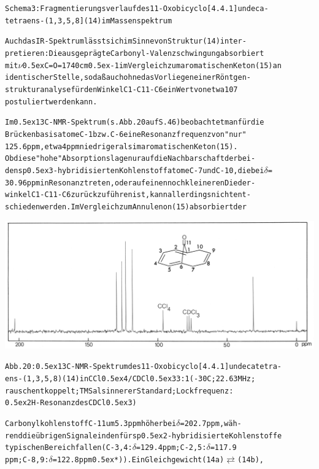 \documentclass[a4paper,11pt]{article}
\begin{document}
\begin{alltt}
Schema 3: Fragmentierungsverlauf des 11-Oxobicyclo[4.4.1]undeca-
tetraens-(1,3,5,8] (14) im Massenspektrum
 

Auch das IR-Spektrum lässt sich im Sinne von Struktur (14) inter-
pretieren: Die ausgeprägte Carbonyl-Valenzschwingung absorbiert
mit \(\nu\)\lower0.5ex\hbox{C=O} = 1740 cm\raise0.5ex\hbox{-1} im Vergleich zum aromatischen Keton (15) an
identischer Stelle, so daß auch ohne das Vorliegen einer Röntgen-
strukturanalyse für den Winkel C1-C11-C6 ein Wert von etwa 107\degree
postuliert werden kann.

Im \raise0.5ex\hbox{13}C-NMR-Spektrum (s. Abb. 20 auf S. 46) beobachtet man für die
Brückenbasisatome C-1 bzw. C-6 eine Resonanzfrequenz von "nur"
125.6 ppm, etwa 4 ppm niedriger als im aromatischen Keton (15).
Ob diese "hohe" Absorptionslage nur auf die Nachbarschaft der bei-
den sp\raise0.5ex\hbox{3}-hybridisierten Kohlenstoffatome C-7 und C-10, die bei \(\delta\) =
30.96 ppm in Resonanz treten, oder auf einen noch kleineren Dieder-
winkel C1-C11-C6 zurückzuführen ist, kann allerdings nicht ent-
schieden werden. Im Vergleich zum Annulenon (15) absorbiert der

\newpage
{}


\end{alltt}
\hspace*{-0.25cm}\includegraphics[width=14.63cm]{NMR_020}
\begin{alltt}
Abb. 20: \raise0.5ex\hbox{13}C-NMR-Spektrum des 11-Oxobicyclo[4.4.1]undecatetra-
ens-(1,3,5,8) (14) in CCl\lower0.5ex\hbox{4}/CDCl\lower0.5ex\hbox{3} 3:1 (-30\degree{}C; 22.63 MHz;
rauschentkoppelt; TMS als innerer Standard; Lockfrequenz:
\leavevmode\raise0.5ex\hbox{2}H-Resonanz des CDCl\lower0.5ex\hbox{3})

Carbonylkohlenstoff C-11 um 5.3 ppm höher bei \(\delta\) = 202.7 ppm, wäh-
rend die übrigen Signale in den für sp\raise0.5ex\hbox{2}-hybridisierte Kohlenstoffe
typischen Bereich fallen (C-3,4: \(\delta\) = 129.4 ppm; C-2,5: \(\delta\) = 117.9
ppm; C-8,9:\(\delta\) = 122.8 ppm \leavevmode\raise0.5ex\hbox{*})). Ein Gleichgewicht (14a) \(\rightleftarrows\) (14b),

\end{alltt}
\end{document}
